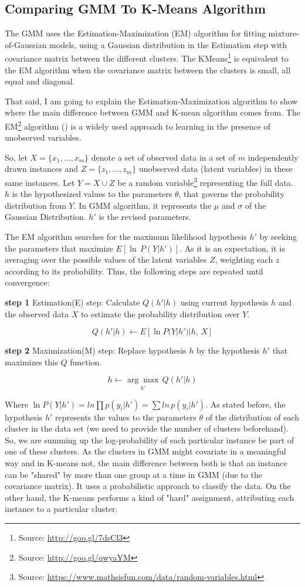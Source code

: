 \documentclass[a4paper]{article}
\begin{document}
\subsection{Comparing GMM To K-Means Algorithm}

The GMM uses the Estimation-Maximization (EM) algorithm for fitting mixture-of-Gaussian models, using a Gaussian distribution in the Estimation step with covariance matrix between the different clusters. The KMeans\footnote{Source: \url{http://goo.gl/7dsCl3}} is equivalent to the EM algorithm when the covariance matrix between the clusters is small, all equal and diagonal.

That said, I am going to explain the Estimation-Maximization algorithm to show where the main difference between GMM and K-mean algorithm comes from. The EM\footnote{Source: \url{http://goo.gl/qwyaYM}} algorithm (\cite{Mitchell}) is a widely used approach to learning in the presence of unobserved variables.

So, let $X = \{x_1, ..., x_m\}$ denote a set of observed data in a set of $m$ independently drawn instances and $Z = \{z_1, ..., z_m\}$ unobserved data (latent variables) in these same instances. Let $Y = X \cup Z$ be a random variable\footnote{Source: \url{https://www.mathsisfun.com/data/random-variables.html}} representing the full data. $h$ is the hypothesized values to the parameters $\theta$, that governs the probability distribution from $Y$. In GMM algorithm, it represents the $\mu$ and $\sigma$ of the Gaussian Distribution. ${h}'$ is the revised parameters.

The EM algorithm searches for the maximum likelihood hypothesis ${h}'$ by seeking the parameters that maximize $E[\ln \, P(Y |{h}')]$. As it is an expectation, it is averaging over the possible values of the latent variables $Z$, weighting each $z$ according to its probability. Thus, the following steps are repeated until convergence:

\textbf{step 1} Estimation(E) step: Calculate $Q({h}'|h)$ using current hypothesis $h$ and the observed data $X$ to estimate the probability distribution over $Y$.

$$Q({h}'|h) \leftarrow E[\ln P(Y | {h}')| h, \, X] $$

\textbf{step 2} Maximization(M) step: Replace hypothesis $h$ by the hypothesis ${h}'$ that maximizes this $Q$ function.

$$h \leftarrow \underset{{h}'}{\arg \max} \, Q({h}'|h)$$

Where $\ln P(Y | {h}') = ln \prod p(y_i| {h}') = \sum ln\, p(y_i| {h}')$. As stated before, the hypothesis ${h}'$ represents the values to the parameters $\theta$ of the distribution of each cluster in the data set (we need to provide the number of clusters beforehand). So, we are summing up the log-probability of each particular instance be part of one of these clusters. As the clusters in GMM might covariate in a meaningful way and in K-means not, the main difference between both is that an instance can be "shared" by more than one group at a time in GMM (due to the covariance matrix). It uses a probabilistic approach to classify the data. On the other hand, the K-means performs a kind of "hard" assignment, attributing each instance to a particular cluster.
\end{document}
